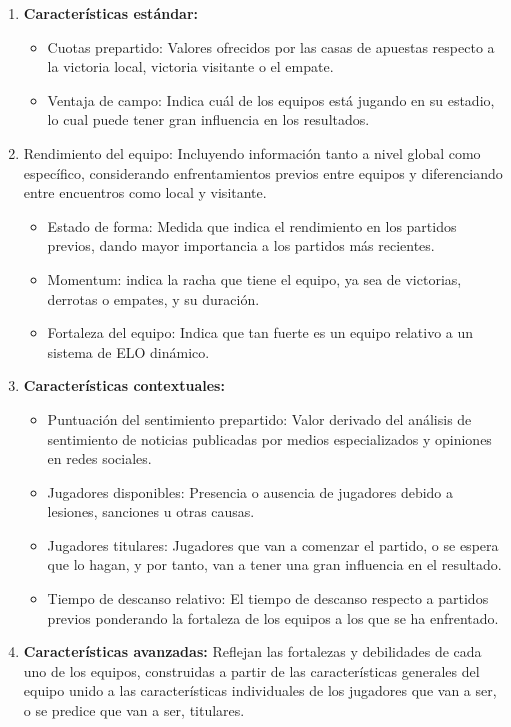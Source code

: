 \begin{enumerate}
    \item \textbf{Características estándar:}
        \begin{itemize}
            \item Cuotas prepartido: Valores ofrecidos por las casas de apuestas respecto a la victoria local, victoria visitante o el empate.
            \item Ventaja de campo: Indica cuál de los equipos está jugando en su estadio, lo cual puede tener gran influencia en los resultados.
        \end{itemize}
    \item Rendimiento del equipo: Incluyendo información tanto a nivel global como específico, considerando enfrentamientos previos entre equipos y diferenciando entre encuentros como local y visitante.
    \begin{itemize}
        \item Estado de forma: Medida que indica el rendimiento en los partidos previos, dando mayor importancia a los partidos más recientes.
        \item Momentum: indica la racha que tiene el equipo, ya sea de victorias, derrotas o empates, y su duración.
        \item Fortaleza del equipo: Indica que tan fuerte es un equipo relativo a un sistema de ELO dinámico.
    \end{itemize}
    \item \textbf{Características contextuales:}
    \begin{itemize}
        \item Puntuación del sentimiento prepartido: Valor derivado del análisis de sentimiento de noticias publicadas por medios especializados y opiniones en redes sociales.
        \item Jugadores disponibles: Presencia o ausencia de jugadores debido a lesiones, sanciones u otras causas.
        \item Jugadores titulares: Jugadores que van a comenzar el partido, o se espera que lo hagan, y por tanto, van a tener una gran influencia en el resultado.
        \item Tiempo de descanso relativo: El tiempo de descanso respecto a partidos previos ponderando la fortaleza de los equipos a los que se ha enfrentado.
    \end{itemize}
    \item \textbf{Características avanzadas:} Reflejan las fortalezas y debilidades de cada uno de los equipos, construidas a partir de las características generales del equipo unido a las características individuales de los jugadores que van a ser, o se predice que van a ser, titulares.

\end{enumerate}
